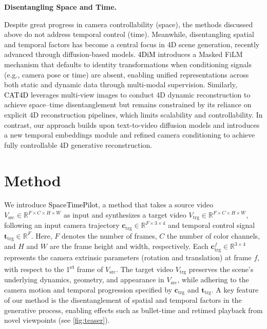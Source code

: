 \documentclass[10pt,twocolumn,letterpaper]{article}
\newcommand{\myparagraph}[1]{%
  \vspace{-0.05em}%
  \par\addvspace{0.4em}%
  \noindent\textbf{#1}\hspace{0.4em}%
}
\newcommand{\nameCOLOR}[1]{\textcolor{black}{#1}}
\newcommand{\nameMethod}{\nameCOLOR{\mbox{SpaceTimePilot}}\xspace}
\newcommand{\fourdim}{\nameCOLOR{\mbox{4DiM}}\xspace}
\newcommand{\catfourd}{\nameCOLOR{\mbox{CAT4D}}\xspace}
\newcommand{\src}{\text{src}}
\newcommand{\trg}{\text{trg}}
\newcommand{\sourcevideo}{V_{\src}}
\newcommand{\targetvideo}{V_{\trg}}
\newcommand{\camera}{\mathbf{c}}
\newcommand{\animatime}{\mathbf{t}}
\newcommand{\numf}{F}
\newcommand{\numchannel}{C}
\newcommand{\width}{W}
\newcommand{\height}{H}
\newcommand{\videospace}{\mathbb{R}^{\numf \times \numchannel \times \height \times \width}}
\begin{document}
\myparagraph{Disentangling Space and Time.}
Despite great progress in camera controllability (space), 
the methods discussed above do not address temporal control (time).
Meanwhile, disentangling spatial and temporal factors has become a central focus in 4D scene generation, recently advanced through diffusion-based models.
\fourdim \cite{watson2025controllingspacetimediffusion} introduces a Masked FiLM mechanism that defaults to identity transformations when conditioning signals (e.g., camera pose or time) are absent, enabling unified representations across both static and dynamic data through multi-modal supervision. Similarly, \catfourd \cite{Wu2024} leverages multi-view images to conduct 4D dynamic reconstruction to achieve space–time disentanglement but remains constrained by its reliance on explicit 4D reconstruction pipelines, which limits scalability and controllability. 
In contrast, our approach builds upon text-to-video diffusion models and introduces a new temporal embeddings module and refined camera conditioning to achieve fully controllable 4D generative reconstruction. 




\section{Method}
\label{sec:method}

We introduce \nameMethod, a method that takes a source video $\sourcevideo \in \videospace$ as input and synthesizes a target video $\targetvideo \in \videospace$, following an input camera trajectory $\camera_{\trg}\in \mathbb{R}^{\numf \times 3 \times 4}$ and temporal control signal $\animatime_{\trg} \in \mathbb{R}^{\numf}$.
Here, $\numf$ denotes the number of frames, $\numchannel$ the number of color channels, 
and $\height$ and $\width$ are the frame height and width, respectively. 
Each $\camera_{\trg}^{f} \in \mathbb{R}^{3 \times 4}$ represents the camera extrinsic 
parameters (rotation and translation) at frame $f$, with respect to the 1\textsuperscript{st} frame of  $\sourcevideo$.
The target video $\targetvideo$ preserves the scene’s underlying dynamics, geometry, and appearance in $\sourcevideo$, while adhering to the camera motion and temporal progression specified by $\camera_{\trg}$ and $\animatime_{\trg}$.
A key feature of our method is the disentanglement of spatial and temporal factors in the generative process, enabling effects such as bullet-time and retimed playback from novel viewpoints (see \cref{fig:teaser}).
\end{document}
